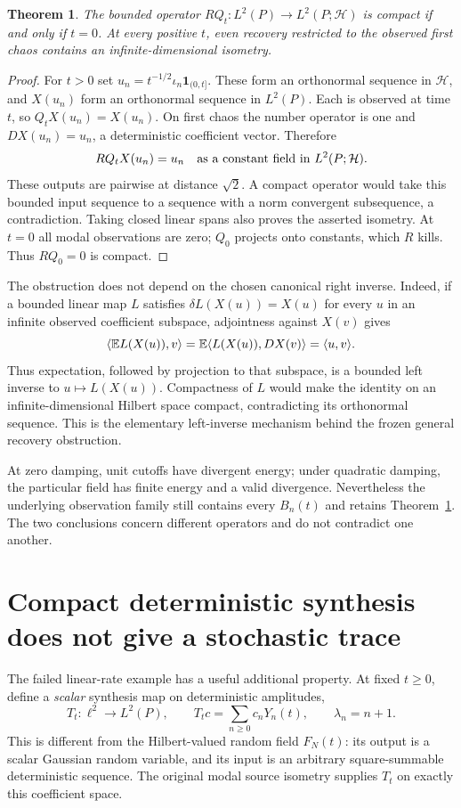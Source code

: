 \documentclass[11pt]{article}
\newtheorem{theorem}{Theorem}[section]
\newcommand{\Hh}{\mathcal H}\newcommand{\tr}{\operatorname{tr}}
\begin{document}
\begin{theorem}\label{thm:noncompact}
The bounded operator $RQ_t:L^2(P)\to L^2(P;\Hh)$ is compact if and
only if $t=0$. At every positive $t$, even recovery restricted to the
observed first chaos contains an infinite-dimensional isometry.
\end{theorem}
\begin{proof}
For $t>0$ set $u_n=t^{-1/2}\iota_n\mathbf1_{(0,t]}$. These form an
orthonormal sequence in $\Hh$, and $X(u_n)$ form an orthonormal
sequence in $L^2(P)$. Each is observed at time $t$, so
$Q_tX(u_n)=X(u_n)$. On first chaos the number operator is one and
$DX(u_n)=u_n$, a deterministic coefficient vector. Therefore
\[
 RQ_tX(u_n)=u_n\quad\hbox{as a constant field in }L^2(P;\Hh).
\]
These outputs are pairwise at distance $\sqrt2$. A compact operator
would take this bounded input sequence to a sequence with a norm
convergent subsequence, a contradiction. Taking closed linear spans
also proves the asserted isometry. At $t=0$ all modal observations
are zero; $Q_0$ projects onto constants, which $R$ kills. Thus
$RQ_0=0$ is compact.
\end{proof}

The obstruction does not depend on the chosen canonical right inverse.
Indeed, if a bounded linear map $L$ satisfies
$\delta L(X(u))=X(u)$ for every $u$ in an infinite observed coefficient
subspace, adjointness against $X(v)$ gives
\[
 \langle\mathbb E L(X(u)),v\rangle
 =\mathbb E\langle L(X(u)),DX(v)\rangle=\langle u,v\rangle.
\]
Thus expectation, followed by projection to that subspace, is a
bounded left inverse to $u\mapsto L(X(u))$. Compactness of $L$ would
make the identity on an infinite-dimensional Hilbert space compact,
contradicting its orthonormal sequence. This is the elementary
left-inverse mechanism behind the frozen general recovery obstruction.

At zero damping, unit cutoffs have divergent energy; under quadratic
damping, the particular field has finite energy and a valid divergence.
Nevertheless the underlying observation family still contains every
$B_n(t)$ and retains Theorem~\ref{thm:noncompact}. The two conclusions
concern different operators and do not contradict one another.

\section{Compact deterministic synthesis does not give a stochastic trace}
The failed linear-rate example has a useful additional property. At fixed
$t\geq0$, define a \emph{scalar} synthesis map on deterministic amplitudes,
\[
 T_t:\ell^2\longrightarrow L^2(P),\qquad
 T_tc=\sum_{n\geq0}c_nY_n(t),\qquad \lambda_n=n+1.
\]
This is different from the Hilbert-valued random field $F_N(t)$: its
output is a scalar Gaussian random variable, and its input is an arbitrary
square-summable deterministic sequence. The original modal source
isometry supplies $T_t$ on exactly this coefficient space.
\end{document}
